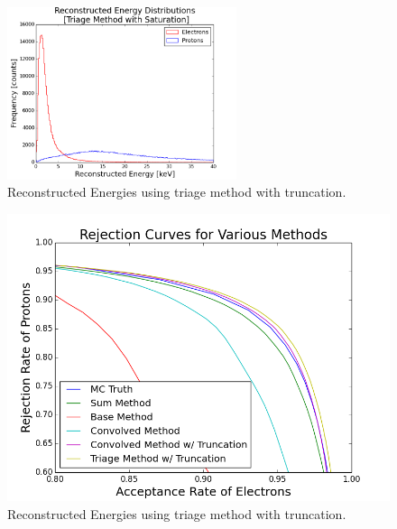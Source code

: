 \begin{figure}[htp!]
    \centering
    \includegraphics[width=0.6\textwidth]{Images2/triage.png}
    \caption{Reconstructed Energies using triage method with truncation.}
    \label{fig:triage}
\end{figure} 





\begin{figure}[htp!]
    \centering
    \includegraphics[scale=0.6]{Images2/rejectAll.png}
    \caption{Reconstructed Energies using triage method with truncation.}
    \label{fig:rejectionPlot}
\end{figure} 


